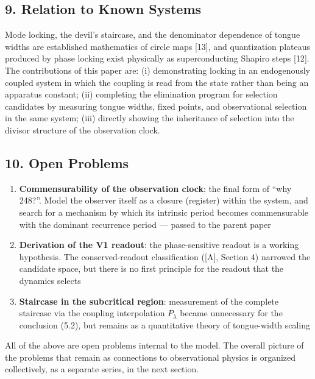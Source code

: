 \documentclass[
  a4paper,
]{article}
\providecommand{\tightlist}{%
  \setlength{\itemsep}{0pt}\setlength{\parskip}{0pt}}
\begin{document}
\subsection{9. Relation to Known
Systems}\label{relation-to-known-systems}

Mode locking, the devil's staircase, and the denominator dependence of
tongue widths are established mathematics of circle maps {[}13{]}, and
quantization plateaus produced by phase locking exist physically as
superconducting Shapiro steps {[}12{]}. The contributions of this paper
are: (i) demonstrating locking in an endogenously coupled system in
which the coupling is read from the state rather than being an apparatus
constant; (ii) completing the elimination program for selection
candidates by measuring tongue widths, fixed points, and observational
selection in the same system; (iii) directly showing the inheritance of
selection into the divisor structure of the observation clock.

\subsection{10. Open Problems}\label{open-problems}

\begin{enumerate}
\def\labelenumi{\arabic{enumi}.}
\tightlist
\item
  \textbf{Commensurability of the observation clock}: the final form of
  ``why 248?''. Model the observer itself as a closure (register) within
  the system, and search for a mechanism by which its intrinsic period
  becomes commensurable with the dominant recurrence period --- passed
  to the parent paper
\item
  \textbf{Derivation of the V1 readout}: the phase-sensitive readout is
  a working hypothesis. The conserved-readout classification ({[}A{]},
  Section 4) narrowed the candidate space, but there is no first
  principle for the readout that the dynamics selects
\item
  \textbf{Staircase in the subcritical region}: measurement of the
  complete staircase via the coupling interpolation \(P_\lambda\) became
  unnecessary for the conclusion (5.2), but remains as a quantitative
  theory of tongue-width scaling
\end{enumerate}

All of the above are open problems internal to the model. The overall
picture of the problems that remain as connections to observational
physics is organized collectively, as a separate series, in the next
section.
\end{document}

